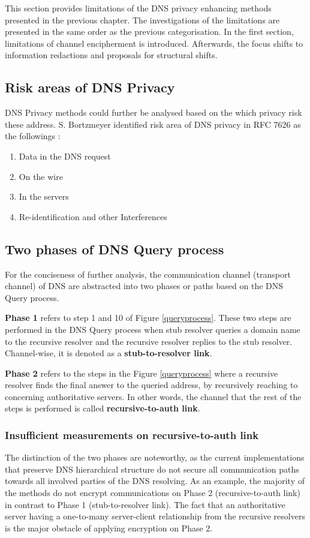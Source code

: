 This section provides limitations of the DNS privacy enhancing methods presented in the previous chapter.
The investigations of the limitations are presented in the same order as the previous categorisation. In the first section, limitations of channel encipherment is introduced.
Afterwards, the focus shifts to information redactions and proposals for structural shifts.

\subsection{Risk areas of DNS Privacy}
DNS Privacy methods could further be analysed based on the which privacy risk these address. S. Bortzmeyer identified risk area of DNS privacy in RFC 7626 as the followings \cite{rfc7626}: 
\begin{enumerate}
    \item Data in the DNS request
    \item On the wire
    \item In the servers
    \item Re-identification and other Interferences
\end{enumerate}

\subsection{Two phases of DNS Query process}
For the conciseness of further analysis, the communication channel (transport channel) of DNS are abstracted into two phases or paths based on the DNS Query process.

\textbf{Phase 1} refers to step 1 and 10 of Figure \ref{queryprocess}. These two steps are performed in the DNS Query process when stub resolver queries a domain name to the recursive resolver and the recursive resolver replies to the stub resolver.
Channel-wise, it is denoted as a \textbf{stub-to-resolver link}.

\textbf{Phase 2} refers to the steps in the Figure \ref{queryprocess} where a recursive resolver finds the final answer to the queried address, by recursively reaching to concerning authoritative servers. In other words, the channel that the rest of the steps is performed is called \textbf{recursive-to-auth link}.

\subsubsection{Insufficient measurements on recursive-to-auth link}\label{recursive-auth-limitations}
The distinction of the two phases are noteworthy, as the current implementations that preserve DNS hierarchical structure do not secure all communication paths towards all involved parties of the DNS resolving.
As an example, the majority of the methods do not encrypt communications on Phase 2 (recursive-to-auth link) in contrast to Phase 1 (stub-to-resolver link).
The fact that an authoritative server having a one-to-many server-client relationship from the recursive resolvers is the major obstacle of applying encryption on Phase 2.

